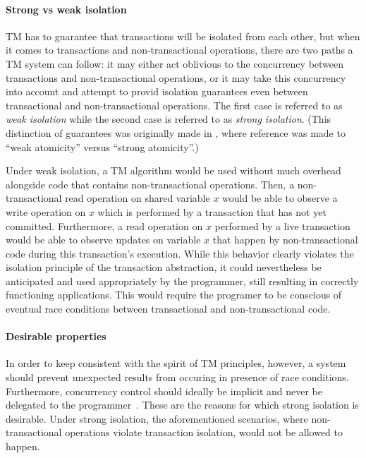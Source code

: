 \documentclass[11pt,letterpaper]{article}
\begin{document}
\paragraph{Strong vs weak isolation}
TM has to guarantee that transactions will be isolated from each other, but
when it  comes to transactions and non-transactional  operations, there are
two  paths a  TM system  can follow:  it may  either act  oblivious  to the
concurrency between transactions and non-transactional 
operations, or  it may  take this concurrency  into account and  attempt to
provid     isolation    guarantees    even   between    transactional   and
non-transactional operations. The first  case is  referred to as \emph{weak
isolation} while the second case is referred to as \emph{strong  
isolation}.  (This  distinction  of   guarantees  was  originally  made  in
\cite{blundell06},  where   reference  was  made   to  {}``weak
atomicity'' versus {}``strong atomicity''.) 

Under weak  isolation, a  TM algorithm would  be used without  much overhead
alongside  code    that  contains  non-transactional  operations.  Then,  a
non-transactional read operation  on shared  variable $x$ would  be able to
observe a write operation on $x$ which is performed by a transaction  
that has not yet committed.  Furthermore, a read operation on $x$ performed
by a  live transaction  would  be able to  observe updates on  variable $x$
that   happen   by  non-transactional   code   during  this   transaction's
execution. While this behavior  clearly violates the isolation principle of
the  transaction abstraction, it could nevertheless be anticipated and used
appropriately by the  
programmer,  still resulting  in correctly  functioning  applications. This
would require the programer 
to  be conscious  of  eventual race  conditions  between transactional  and
non-transactional code.  


\paragraph{Desirable properties}
In order  to keep consistent with  the spirit of TM  principles, however, a
system should prevent unexpected   results  from   occuring  
in presence of  race conditions. 
Furthermore, concurrency   control should  ideally be implicit  
and never be delegated to  the programmer~\cite{CIR12,MS12}.  These are the  
reasons for  which strong isolation  is desirable. Under  strong isolation,
the aforementioned scenarios,   where non-transactional operations  violate
transaction isolation, would not be allowed to happen.  
\end{document}
